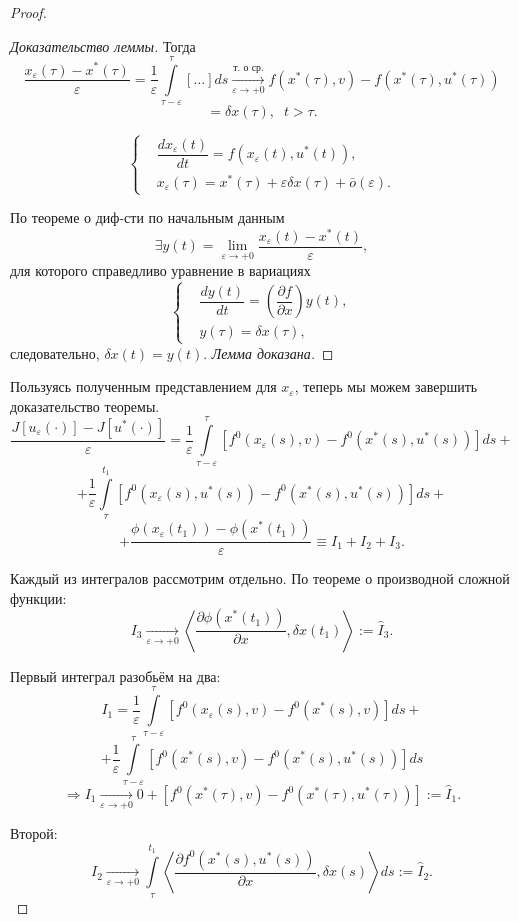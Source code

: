 \documentclass[12pt, a4paper]{article}
\theoremstyle{rusdef}
\newcommand\scalar[1]{\left < #1 \right >} %
\renewcommand{\d}{\partial} %
\DeclareMathOperator*{\thus}{\Rightarrow} %
\DeclareMathOperator*{\To}{\longrightarrow}
\begin{document}
\begin{proof}
\begin{proof}[Доказательство леммы]
Тогда 
$$
\dfrac{x_{\varepsilon}(\tau) - x^*(\tau)}{\varepsilon} = \dfrac{1}{\varepsilon} \int\limits_{\tau - \varepsilon}^{\tau} [\ldots] ds \To\limits_{\varepsilon \to +0}^{\text{т. о ср.}} f(x^*(\tau), v) - f(x^*(\tau), u^*(\tau))
$$
$$
= \delta x(\tau), \;\; t > \tau.
$$

$$
\left\{
\begin{aligned}
& \dfrac{d x_{\varepsilon}(t)}{dt} = f(x_{\varepsilon}(t), u^*(t)), \\
& x_{\varepsilon}(\tau) = x^*(\tau) + \varepsilon \delta x(\tau) + \bar{o}(\varepsilon).
\end{aligned}
\right.
$$

По теореме о диф-сти по начальным данным
$$
\exists y(t) = \lim\limits_{\varepsilon \to +0} \dfrac{x_{\varepsilon}(t) - x^*(t)}{\varepsilon},
$$
для которого справедливо уравнение в вариациях
$$
\left\{
\begin{aligned}
& \dfrac{dy(t)}{dt} = \left( \dfrac{\d f}{\d x} \right) y(t), \\
& y(\tau) = \delta x(\tau),
\end{aligned}
\right.
$$
следовательно, $\delta x(t) = y(t)$. \textit{Лемма доказана.}
\end{proof}

Пользуясь полученным представлением для $x_{\varepsilon}$, теперь мы можем завершить доказательство теоремы.
$$
\dfrac{J[u_{\varepsilon}(\cdot)] - J[u^*(\cdot)]}{\varepsilon} = \dfrac{1}{\varepsilon} \int\limits_{\tau - \varepsilon}^{\tau} \left[ f^0(x_{\varepsilon}(s),v) - f^0(x^*(s), u^*(s)) \right]ds +
$$
$$
+ \dfrac{1}{\varepsilon} \int\limits_{\tau}^{t_1}\left[ f^0(x_\varepsilon(s), u^*(s)) - f^0(x^*(s), u^*(s)) \right] ds + 
$$
$$
+ \dfrac{\phi(x_\varepsilon(t_1)) - \phi(x^*(t_1))}{\varepsilon} \equiv I_1 + I_2 + I_3.
$$

Каждый из интегралов рассмотрим отдельно. По теореме о производной сложной функции:
$$
I_3 \To\limits_{\varepsilon \to +0} \scalar{\dfrac{\d \phi(x^*(t_1))}{\d x}, \delta x(t_1)} := \hat{I}_3.
$$

Первый интеграл разобьём на два:
$$
I_1 = \frac{1}{\varepsilon} \int\limits_{\tau - \varepsilon}^{\tau}\left[ f^0(x_{\varepsilon}(s), v) - f^0(x^*(s), v) \right] ds +
$$
$$
+ \frac{1}{\varepsilon} \int\limits_{\tau - \varepsilon}^{\tau}\left[ f^0(x^*(s), v) - f^0(x^*(s), u^*(s)) \right] ds
$$
$$
\thus I_1 \To\limits_{\varepsilon \to +0} 0 + [f^0(x^*(\tau),v) - f^0(x^*(\tau), u^*(\tau))] := \hat{I}_1.
$$

Второй:
$$
I_2 \To\limits_{\varepsilon \to +0} \int\limits_{\tau}^{t_1} \scalar{\dfrac{\d f^0(x^*(s), u^*(s))}{\d x}, \delta x(s)} ds := \hat{I}_2.
$$


\end{proof}
\end{document}
